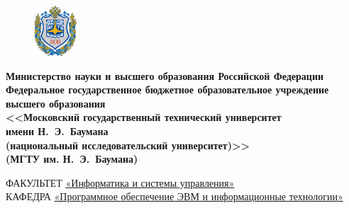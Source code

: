 \documentclass[a4paper]{article}
\begin{document}
	\begin{titlepage}
		\centering
		\begin{figure}
			\vspace{5mm}
			\hspace{-5.8mm}
			\includegraphics[width=0.93\linewidth]{gerb}
		\end{figure}
		{\singlespacing \footnotesize \bfseries Министерство науки и высшего образования Российской Федерации\\Федеральное государственное бюджетное образовательное учреждение\\высшего образования\\<<Московский государственный технический университет\\имени Н.~Э.~Баумана\\ (национальный исследовательский университет)>>\\(МГТУ им. Н.~Э.~Баумана)\\}
		
		\textbf {\bf \underline{\hspace{\linewidth}}}
		\doublespacing \small \raggedright ФАКУЛЬТЕТ \hspace{25mm} \underline { «Информатика и системы управления»}\\
		КАФЕДРА \hspace{5mm} \underline {«Программное обеспечение ЭВМ и информационные технологии»}\\
		

\end{titlepage}
\end{document}
